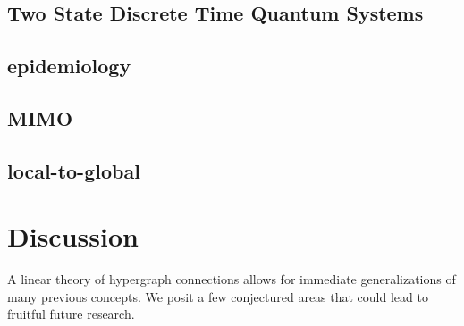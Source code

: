 \documentclass{article}
\begin{document}
\subsection{Two State Discrete Time Quantum Systems}
\subsection{epidemiology}
\subsection{MIMO}
\subsection{local-to-global}

\section{Discussion}
A linear theory of hypergraph connections allows for immediate generalizations of many previous concepts. We posit a few conjectured areas that could lead to fruitful future research.
\end{document}
